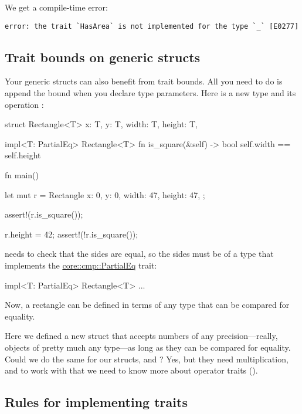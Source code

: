 We get a compile-time error:

\begin{verbatim}
error: the trait `HasArea` is not implemented for the type `_` [E0277]
\end{verbatim}

\subsection*{Trait bounds on generic structs}

Your generic structs can also benefit from trait bounds. All you need to do is append the bound when you declare type parameters. Here is a 
new type  and its operation :

\begin{rustc}
struct Rectangle<T> {
    x: T,
    y: T,
    width: T,
    height: T,
}

impl<T: PartialEq> Rectangle<T> {
    fn is_square(&self) -> bool {
        self.width == self.height
    }
}

fn main() {
    let mut r = Rectangle {
        x: 0,
        y: 0,
        width: 47,
        height: 47,
    };

    assert!(r.is_square());

    r.height = 42;
    assert!(!r.is_square());
}
\end{rustc}

 needs to check that the sides are equal, so the sides must be of a type that implements the 
\href{https://doc.rust-lang.org/core/cmp/trait.PartialEq.html}{core::cmp::PartialEq} trait:

\begin{rustc}
impl<T: PartialEq> Rectangle<T> { ... }
\end{rustc}

Now, a rectangle can be defined in terms of any type that can be compared for equality.

\blank

Here we defined a new struct  that accepts numbers of any precision—really, objects of pretty much any type—as long as they 
can be compared for equality. Could we do the same for our  structs,  and ? Yes, but they need
multiplication, and to work with that we need to know more about operator traits ().

\subsection*{Rules for implementing traits}

